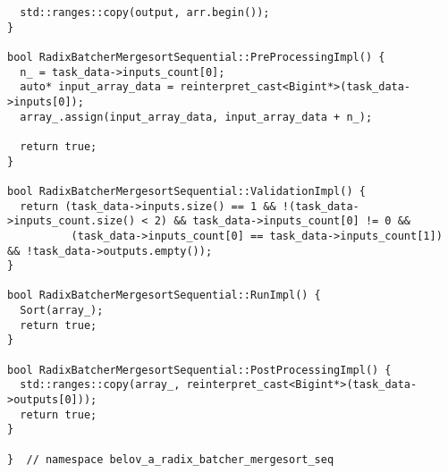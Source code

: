 \documentclass[a4paper,12pt]{article}
\begin{document}
\begin{lstlisting}
  std::ranges::copy(output, arr.begin());
}

bool RadixBatcherMergesortSequential::PreProcessingImpl() {
  n_ = task_data->inputs_count[0];
  auto* input_array_data = reinterpret_cast<Bigint*>(task_data->inputs[0]);
  array_.assign(input_array_data, input_array_data + n_);

  return true;
}

bool RadixBatcherMergesortSequential::ValidationImpl() {
  return (task_data->inputs.size() == 1 && !(task_data->inputs_count.size() < 2) && task_data->inputs_count[0] != 0 &&
          (task_data->inputs_count[0] == task_data->inputs_count[1]) && !task_data->outputs.empty());
}

bool RadixBatcherMergesortSequential::RunImpl() {
  Sort(array_);
  return true;
}

bool RadixBatcherMergesortSequential::PostProcessingImpl() {
  std::ranges::copy(array_, reinterpret_cast<Bigint*>(task_data->outputs[0]));
  return true;
}

}  // namespace belov_a_radix_batcher_mergesort_seq
\end{lstlisting}
\end{document}
